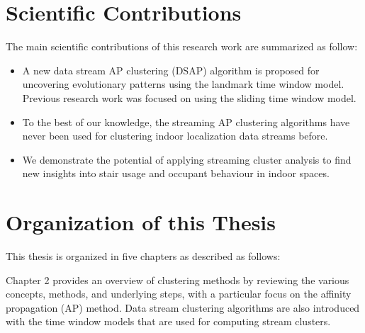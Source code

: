

\section{Scientific Contributions}


The main scientific contributions of this research work are summarized as follow:

\begin{itemize}
    
    \item A new data stream AP clustering (DSAP) algorithm is proposed for uncovering evolutionary patterns using the landmark time window model. Previous research work was focused on using the sliding time window model.
    
    \item  To the best of our knowledge, the streaming AP clustering algorithms have never been used for clustering indoor localization data streams before. 
    
    \item We demonstrate the potential of applying streaming cluster analysis to find new insights into stair usage and occupant behaviour in indoor spaces.
\end{itemize}




\section{Organization of this Thesis}
This thesis is organized in five chapters as described as follows:

Chapter 2 provides an overview of clustering methods by reviewing the various concepts, methods, and underlying steps, with a particular focus on the affinity propagation (AP) method.  Data stream clustering algorithms are also introduced with the time window models that are used for computing stream clusters.

